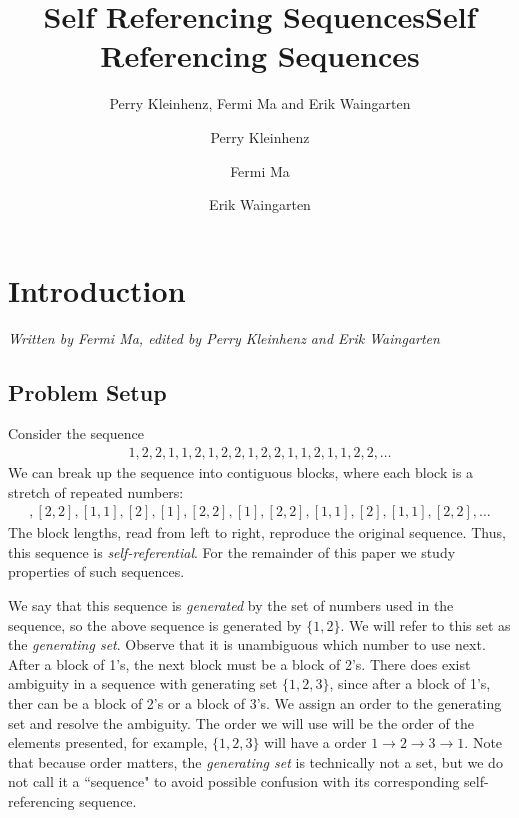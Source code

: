 \documentclass[runningheads,a4paper]{llncs}
\title{Self Referencing Sequences}
\author{Perry Kleinhenz, Fermi Ma and Erik Waingarten}
\date{}							%
\begin{document}
\title{Self Referencing Sequences}

\author{Perry Kleinhenz \and Fermi Ma \and Erik Waingarten}
%


\maketitle

\section{Introduction}

\emph{Written by Fermi Ma, edited by Perry Kleinhenz and Erik Waingarten}

\subsection{Problem Setup}
Consider the sequence
\begin{align*}
1,2,2,1,1,2,1,2,2,1,2,2,1,1,2,1,1,2,2,\dots
\end{align*}
We can break up the sequence into contiguous blocks, where each block is a stretch of repeated numbers:
\begin{align*}
[1],[2,2],[1,1],[2],[1],[2,2],[1],[2,2],[1,1],[2],[1,1],[2,2],\dots
\end{align*}
The block lengths, read from left to right, reproduce the original sequence. Thus, this sequence is \emph{self-referential}. For the remainder of this paper we study properties of such sequences. 

We say that this sequence is \emph{generated} by the set of numbers used in the sequence, so the above sequence is generated by $\{1,2\}$. We will refer to this set as the \emph{generating set}. Observe that it is unambiguous which number to use next. After a block of 1's, the next block must be a block of 2's. There does exist ambiguity in a sequence with generating set $\{1,2,3\}$, since after a block of 1's, ther can be a block of 2's or a block of 3's. We assign an order to the generating set and resolve the ambiguity. The order we will use will be the order of the elements presented, for example, $\{1, 2, 3 \}$ will have a order $1 \rightarrow 2 \rightarrow 3 \rightarrow 1$. Note that because order matters, the \emph{generating set} is technically not a set, but we do not call it a ``sequence" to avoid possible confusion with its corresponding self-referencing sequence.
\end{document}
